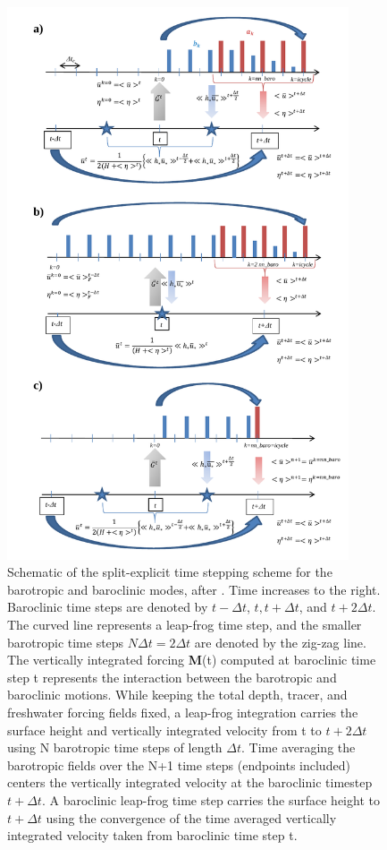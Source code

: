 \begin{figure}[!t] 	\begin{center}
\includegraphics[width=0.90\textwidth]{./Figures/Fig_DYN_dynspg_ts.pdf}
\caption{	 \label{Fig_DYN_dynspg_ts}
Schematic of the split-explicit time stepping scheme for the barotropic and baroclinic modes, 
after \citet{Griffies2004}. Time increases to the right. Baroclinic time steps are denoted by 
$t-\Delta t$, $t, t+\Delta t$, and $t+2\Delta t$. The curved line represents a leap-frog time step, 
and the smaller barotropic time steps $N \Delta t=2\Delta t$ are denoted by the zig-zag line. 
The vertically integrated forcing \textbf{M}(t) computed at baroclinic time step t represents 
the interaction between the barotropic and baroclinic motions. While keeping the total depth, 
tracer, and freshwater forcing fields fixed, a leap-frog integration carries the surface height 
and vertically integrated velocity from t to $t+2 \Delta t$ using N barotropic time steps of length 
$\Delta t$. Time averaging the barotropic fields over the N+1 time steps (endpoints included) 
centers the vertically integrated velocity at the baroclinic timestep $t+\Delta t$. 
A baroclinic leap-frog time step carries the surface height to $t+\Delta t$ using the convergence 
of the time averaged vertically integrated velocity taken from baroclinic time step t. }
\end{center}
\end{figure}
